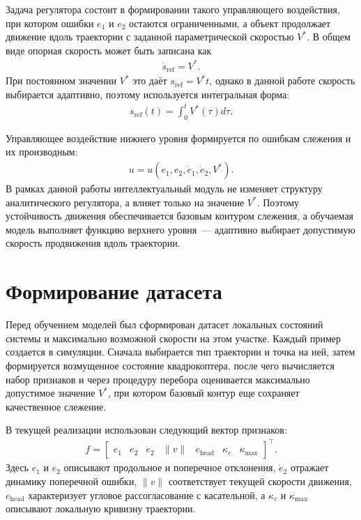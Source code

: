Задача регулятора состоит в формировании такого управляющего воздействия,
при котором ошибки $e_1$ и $e_2$ остаются ограниченными, а объект продолжает
движение вдоль траектории с заданной параметрической скоростью $V^*$.
В общем виде опорная скорость может быть записана как
\begin{gather}
    \dot s_{\mathrm{ref}} = V^*.
\end{gather}
При постоянном значении $V^*$ это даёт $s_{\mathrm{ref}} = V^*t$, однако
в данной работе скорость выбирается адаптивно, поэтому используется
интегральная форма:
\begin{gather}
    s_{\mathrm{ref}}(t)=\int_0^t V^*(\tau)d\tau.
\end{gather}

Управляющее воздействие нижнего уровня формируется по ошибкам слежения
и их производным:
\begin{gather}
    u = u(e_1, e_2, \dot e_1, \dot e_2, V^*).
\end{gather}
В рамках данной работы интеллектуальный модуль не изменяет структуру
аналитического регулятора, а влияет только на значение $V^*$. Поэтому
устойчивость движения обеспечивается базовым контуром слежения, а обучаемая
модель выполняет функцию верхнего уровня~--- адаптивно выбирает допустимую
скорость продвижения вдоль траектории.


\section{Формирование датасета}\label{sec:form_dataset}

Перед обучением моделей был сформирован датасет локальных состояний системы и максимально возможной скорости на этом участке.
Каждый пример создается в симуляции.
Сначала выбирается тип траектории и точка на ней, затем формируется возмущенное состояние квадрокоптера, после чего вычисляется набор признаков и через процедуру перебора оценивается максимально допустимое значение $V^{\ast}$, при котором базовый контур еще сохраняет качественное слежение.

В текущей реализации использован следующий вектор признаков:
\begin{gather}
    f =
    \begin{bmatrix}
        e_1 & e_2 & \dot{e}_2 & \lVert v \rVert & e_{\mathrm{head}} & \kappa_c & \kappa_{\max}
    \end{bmatrix}^{\top}.
\end{gather}
Здесь $e_1$ и $e_2$ описывают продольное и поперечное отклонения, $\dot{e}_2$ отражает динамику поперечной ошибки, $\lVert v \rVert$ соответствует текущей скорости движения, $e_{\mathrm{head}}$ характеризует угловое рассогласование с касательной, а $\kappa_c$ и $\kappa_{\max}$ описывают локальную кривизну траектории.

